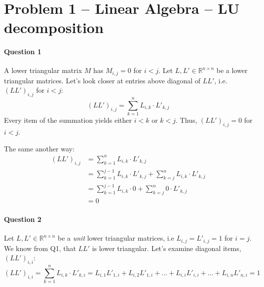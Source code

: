 \section{Problem 1 – Linear Algebra – LU decomposition}

\paragraph{Question 1}
A lower triangular matrix $M$ has $M_{i,j} = 0$ for $i < j$.
Let $L, L' \in \mathbb{R}^{n\times n}$ be a lower triangular matrices.
Let's look closer at entries above diagonal of $LL'$, i.e. $(LL')_{i,j}$ for $i<j$:
\begin{equation*}
    (LL')_{i,j} = \sum_{k=1}^{n} L_{i,k} \cdot L'_{k,j}
\end{equation*}
Every item of the summation yields either $i<k$ or $k<j$.
Thus,  $(LL')_{i,j} = 0$ for $i<j$.

The same another way:
\begin{align*}
    (LL')_{i,j} &= \sum_{k=1}^{n} L_{i,k} \cdot L'_{k,j} \\
                &= \sum_{k=1}^{j-1} L_{i,k} \cdot L'_{k,j} + \sum_{k=j}^{n} L_{i,k} \cdot L'_{k,j} \\
                &= \sum_{k=1}^{j-1} L_{i,k} \cdot 0 + \sum_{k=j}^{n} 0 \cdot L'_{k,j} \\
                &= 0
\end{align*}


\paragraph{Question 2}
Let $L, L' \in \mathbb{R}^{n\times n}$ be a \emph{unit} lower triangular matrices, i.e $L_{i,j} = L'_{i,j} = 1$ for $i = j$.
We know from Q1, that $LL'$ is lower triangular.
Let's examine diagonal items, $(LL')_{i,i}$:
\begin{equation*}
    (LL')_{i,i} = \sum_{k=1}^{n} L_{i,k} \cdot L'_{k,i}
            = L_{i,1} L'_{1,i} + L_{i,2} L'_{1,i} + \dots + L_{i,i} L'_{i,i} + \dots + L_{i,n} L'_{n,i} = 1
\end{equation*}


